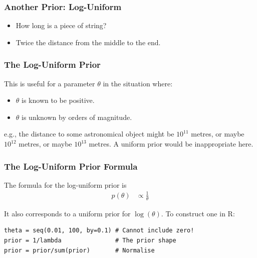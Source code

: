 \documentclass{beamer}
\begin{document}
\begin{frame}
\frametitle{Another Prior: Log-Uniform}

\begin{itemize}
\item How long is a piece of string?\pause
\item Twice the distance from the middle to the end.
\end{itemize}

\end{frame}


\begin{frame}
\frametitle{The Log-Uniform Prior}
This is useful for a parameter $\theta$ in the situation where:

\begin{itemize}
\item $\theta$ is known to be positive.\pause
\item $\theta$ is unknown by orders of magnitude.\pause
\end{itemize}
\vspace{0.5em}
e.g., the distance to some astronomical object might be
$10^{11}$ metres, or maybe $10^{12}$ metres, or maybe $10^{13}$
metres. A uniform prior would be inappropriate here.

\end{frame}



\begin{frame}[fragile]
\frametitle{The Log-Uniform Prior Formula}

The formula for the log-uniform prior is
\begin{align}
p(\theta) &\propto \frac{1}{\theta}
\end{align}

It also corresponds to a uniform prior for $\log(\theta)$.
To construct one in R:
\begin{verbatim}
theta = seq(0.01, 100, by=0.1) # Cannot include zero!
prior = 1/lambda               # The prior shape 
prior = prior/sum(prior)       # Normalise
\end{verbatim}

\end{frame}
\end{document}

